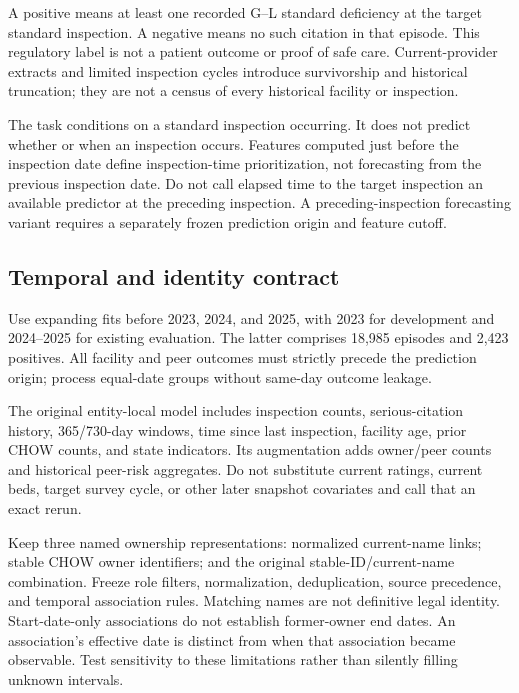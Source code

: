 \documentclass[11pt,a4paper]{article}
\begin{document}
A positive means at least one recorded G--L standard deficiency at the target standard inspection. A negative means no such citation in that episode. This regulatory label is not a patient outcome or proof of safe care. Current-provider extracts and limited inspection cycles introduce survivorship and historical truncation; they are not a census of every historical facility or inspection.

The task conditions on a standard inspection occurring. It does not predict whether or when an inspection occurs. Features computed just before the inspection date define inspection-time prioritization, not forecasting from the previous inspection date. Do not call elapsed time to the target inspection an available predictor at the preceding inspection. A preceding-inspection forecasting variant requires a separately frozen prediction origin and feature cutoff.

\subsection{Temporal and identity contract}
Use expanding fits before 2023, 2024, and 2025, with 2023 for development and 2024--2025 for existing evaluation. The latter comprises 18,985 episodes and 2,423 positives. All facility and peer outcomes must strictly precede the prediction origin; process equal-date groups without same-day outcome leakage.

The original entity-local model includes inspection counts, serious-citation history, 365/730-day windows, time since last inspection, facility age, prior CHOW counts, and state indicators. Its augmentation adds owner/peer counts and historical peer-risk aggregates. Do not substitute current ratings, current beds, target survey cycle, or other later snapshot covariates and call that an exact rerun.

Keep three named ownership representations: normalized current-name links; stable CHOW owner identifiers; and the original stable-ID/current-name combination. Freeze role filters, normalization, deduplication, source precedence, and temporal association rules. Matching names are not definitive legal identity. Start-date-only associations do not establish former-owner end dates. An association's effective date is distinct from when that association became observable. Test sensitivity to these limitations rather than silently filling unknown intervals.
\end{document}
